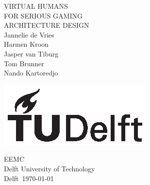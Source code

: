 \documentclass[]{article}
\begin{document}
	
	\begin{titlepage}
		\centering
		
		{\Huge VIRTUAL HUMANS}\\[1em]
		{\huge FOR SERIOUS GAMING}\\[1em]
		{\Large ARCHITECTURE DESIGN}\\[2em]
		{Jannelie de Vries}\\
		{Harmen Kroon}\\
		{Jasper van Tiburg}\\
		{Tom Brunner}\\
		{Nando Kartoredjo}
		
		\vfill
		
		\includegraphics{TU_Delft_logo_Black.eps}
		
		EEMC\\
		Delft University of Technology\\
		Delft\
		\today		
	\end{titlepage}
	
	\tableofcontents
	\newpage
	
	
	
	

	
\end{document}
